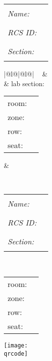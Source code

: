 \documentclass[11pt]{article}
\makeatletter
\newcommand{\fillinname}
{
\begin{minipage}{3.2in}
\begin{tabular}{lr}
{\em Name:} & \rule{2.5in}{0.4pt} \vspace{0.2in} \\ 
{\em RCS ID:} & \rule{2.5in}{0.4pt} \vspace{0.2in} \\ 
{\em Section:} & \rule{2.5in}{0.4pt}
\end{tabular}
\end{minipage}
}
\newcommand{\studentname}
{
\renewcommand{\arraystretch}{1.5}
\begin{tabular}{|@{\hspace{0.1in}}l@{\hspace{0.1in}}|@{\hspace{0.1in}}l@{\hspace{0.1in}}|}
\hline
\multirow{2}{2.4in}
{\bf \Large \studentfirstname ~ \studentlastname}
&
\studentemail
\\
%
&
lab section: \studentlabsection
\\
%
\hline
%
\begin{minipage}{2.5in}
\begin{tabular}{ll}
\vspace{-0.08in}
room:& \studentroom \\
\vspace{-0.08in}
zone:& \studentzone \\
\vspace{-0.08in}
row:& \studentrow \\
\vspace{-0.08in}
seat:& \studentseat
\end{tabular}
\medskip \end{minipage}  &
\begin{minipage}{2in} \smallskip \studenttime \smallskip \end{minipage}
\\
\hline
%
\end{tabular}
\renewcommand{\arraystretch}{1.0}
}
\newcommand{\zoneonly}
{
\fillinname
\hfill
\begin{minipage}{1.5in}
\renewcommand{\arraystretch}{1.5}
{\bf \Large \studentfirstname ~ \studentlastname} \vspace{0.1in} \\
\begin{tabular}{ll}
\vspace{-0.08in}
room:& \studentroom \\
\vspace{-0.08in}
zone:& \studentzone \\
\vspace{-0.08in}
row:& \studentrow \\
\vspace{-0.08in}
seat:& \studentseat 
\end{tabular}
\renewcommand{\arraystretch}{1.0}
\end{minipage}
}
\makeatother
\begin{document}
\vspace*{0.6in}
\thispagestyle{plain}



\beginnone
\begin{minipage}{5.3in}
\fillinname
\end{minipage}
\fi
%
\beginzoneandname
\begin{minipage}{5.3in}
\studentname
\end{minipage}
\fi
%
\beginzoneonly
\begin{minipage}{5.3in}
\zoneonly
\end{minipage}
\fi
%
\hfill
\begin{minipage}{2.0in}
\texttt{[image: \\qrcode]}
\end{minipage}

\newpage

~
\end{document}
